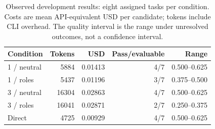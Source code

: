 \begin{table}[htbp]
\centering\small
\caption{Observed development results: eight assigned tasks per condition. Costs are mean API-equivalent USD per candidate; tokens include CLI overhead. The quality interval is the range under unresolved outcomes, not a confidence interval.}
\label{tab:codexpilot}
\begin{tabular}{lrrrr}
\toprule
Condition & Tokens & USD & Pass/evaluable & Range \\
\midrule
1 / neutral & 5884 & 0.01413 & 4/7 & 0.500--0.625 \\
1 / roles & 5437 & 0.01196 & 3/7 & 0.375--0.500 \\
3 / neutral & 16304 & 0.02863 & 4/7 & 0.500--0.625 \\
3 / roles & 16041 & 0.02871 & 2/7 & 0.250--0.375 \\
Direct & 4725 & 0.00929 & 4/7 & 0.500--0.625 \\
\bottomrule
\end{tabular}
\end{table}
